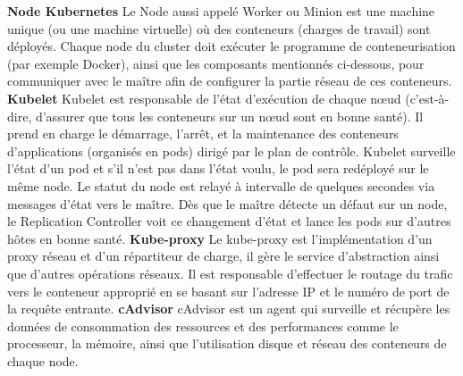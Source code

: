 \documentclass{article}
\begin{document}
\newline
\newline
\textbf{Node Kubernetes}
\newline
\newline
Le Node aussi appelé Worker ou Minion est une machine unique (ou une machine virtuelle) où des conteneurs (charges de travail) sont déployés. Chaque node du cluster doit exécuter le programme de conteneurisation (par exemple Docker), ainsi que les composants mentionnés ci-dessous, pour communiquer avec le maître afin de configurer la partie réseau de ces conteneurs.
\newline
\newline
\newline
\newline
\textbf{Kubelet}
\newline
\newline
Kubelet est responsable de l'état d'exécution de chaque nœud (c'est-à-dire, d'assurer que tous les conteneurs sur un nœud sont en bonne santé). Il prend en charge le démarrage, l'arrêt, et la maintenance des conteneurs d'applications (organisés en pods) dirigé par le plan de contrôle.
\newline
\newline
Kubelet surveille l'état d'un pod et s'il n'est pas dans l'état voulu, le pod sera redéployé sur le même node. Le statut du node est relayé à intervalle de quelques secondes via messages d’état vers le maître. Dès que le maître détecte un défaut sur un node, le Replication Controller voit ce changement d'état et lance les pods sur d'autres hôtes en bonne santé.
\newline
\newline
\textbf{Kube-proxy}
\newline
\newline
Le kube-proxy est l’implémentation d'un proxy réseau et d'un répartiteur de charge, il gère le service d'abstraction ainsi que d'autres opérations réseaux. Il est responsable d'effectuer le routage du trafic vers le conteneur approprié en se basant sur l'adresse IP et le numéro de port de la requête entrante.
\newline
\newline
\textbf{cAdvisor}
\newline
\newline
cAdvisor est un agent qui surveille et récupère les données de consommation des ressources et des performances comme le processeur, la mémoire, ainsi que l'utilisation disque et réseau des conteneurs de chaque node. 
\newline
\newline
\newpage
\end{document}
